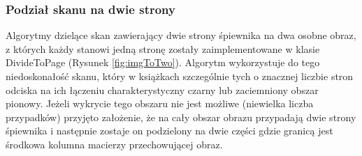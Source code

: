 \documentclass[a4paper,12pt]{article}
\newcommand\spacingIndent{2.2em}
\begin{document}
		\subsubsection{Podział skanu na dwie strony}
		    \hspace{\spacingIndent} Algorytmy dzielące skan zawierający dwie strony śpiewnika na dwa osobne obraz, z których każdy stanowi jedną stronę
		    zostały zaimplementowane w klasie DivideToPage (Rysunek \ref{fig:imgToTwo}). Algorytm wykorzystuje do tego niedoskonałość          skanu, który w książkach szczególnie tych o znacznej liczbie stron          odciska na ich łączeniu charakterystyczny czarny lub zaciemniony          obszar pionowy. Jeżeli wykrycie tego obszaru nie jest możliwe (niewielka    liczba przypadków) przyjęto założenie, że na cały obszar obrazu przypadają dwie strony śpiewnika i następnie zostaje on podzielony na dwie części gdzie granicą jest środkowa kolumna macierzy przechowującej obraz.    
		    
\end{document}
